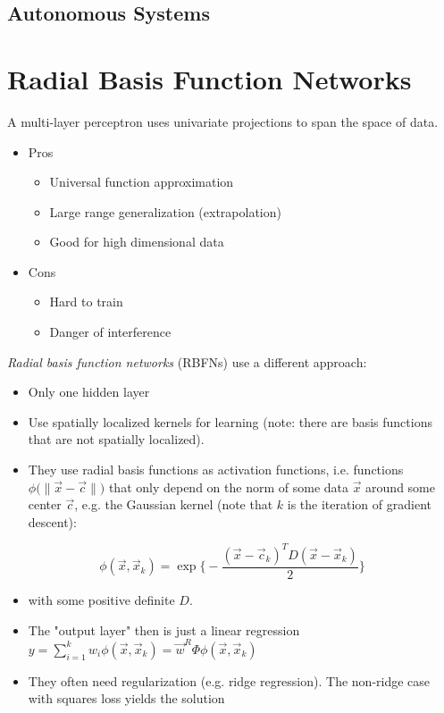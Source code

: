 		\subsection{Autonomous Systems} %


	\section{Radial Basis Function Networks} %

		A multi-layer perceptron uses univariate projections to span the space of data.
		\begin{itemize}
			\item Pros
				\begin{itemize}
					\item Universal function approximation
					\item Large range generalization (extrapolation)
					\item Good for high dimensional data
				\end{itemize}
			\item Cons
				\begin{itemize}
					\item Hard to train
					\item Danger of interference
				\end{itemize}
		\end{itemize}
		\emph{Radial basis function networks} (RBFNs) use a different approach:
		\begin{itemize}
			\item Only one hidden layer
			\item Use spatially localized kernels for learning (note: there are basis functions that are not spatially localized).
			\item They use radial basis functions as activation functions, i.e. functions \( \phi\big(\lVert \vec{x} - \vec{c} \rVert\big) \) that only depend on the norm of some data \(\vec{x}\) around some center \(\vec{c}\), e.g. the Gaussian kernel (note that \(k\) is the iteration of gradient descent):
		\end{itemize}
		\begin{equation}
			\phi(\vec{x}, \vec{x}_k) = \exp\Bigg\{ -\frac{(\vec{x} - \vec{c}_k)^T D (\vec{x} - \vec{x}_k)}{2} \Bigg\}
		\end{equation}
		\begin{itemize}
			\item[] with some positive definite \(D\).
			\item The "output layer" then is just a linear regression \( y = \sum_{i = 1}^{k} w_i \phi(\vec{x}, \vec{x}_k) = \vec{w}^R \Phi\phi(\vec{x}, \vec{x}_k) \)
			\item They often need regularization (e.g. ridge regression). The non-ridge case with squares loss yields the solution
		\end{itemize}
